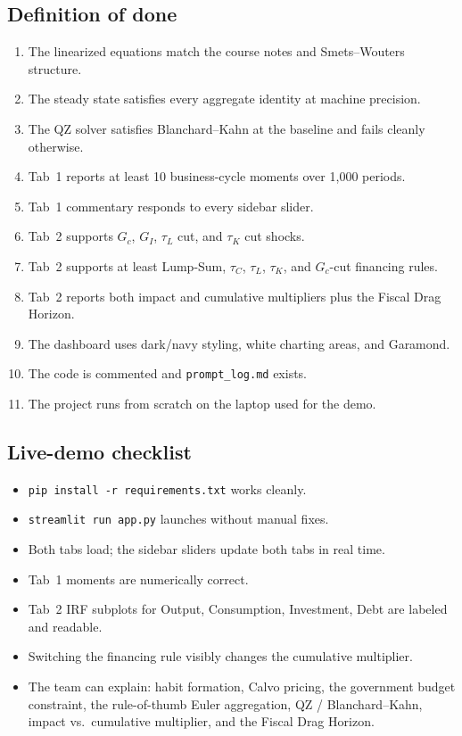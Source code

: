 \documentclass[11pt]{article}
\begin{document}
\subsection{Definition of done}
\begin{enumerate}[label=\textbf{\arabic*.}]
    \item The linearized equations match the course notes and Smets--Wouters structure.
    \item The steady state satisfies every aggregate identity at machine precision.
    \item The QZ solver satisfies Blanchard--Kahn at the baseline and fails cleanly otherwise.
    \item Tab~1 reports at least 10 business-cycle moments over 1{,}000 periods.
    \item Tab~1 commentary responds to every sidebar slider.
    \item Tab~2 supports $G_c$, $G_I$, $\tau_L$ cut, and $\tau_K$ cut shocks.
    \item Tab~2 supports at least Lump-Sum, $\tau_C$, $\tau_L$, $\tau_K$, and $G_c$-cut financing rules.
    \item Tab~2 reports both impact and cumulative multipliers plus the Fiscal Drag Horizon.
    \item The dashboard uses dark/navy styling, white charting areas, and Garamond.
    \item The code is commented and \texttt{prompt\_log.md} exists.
    \item The project runs from scratch on the laptop used for the demo.
\end{enumerate}

\subsection{Live-demo checklist}
\begin{itemize}
    \item \texttt{pip install -r requirements.txt} works cleanly.
    \item \texttt{streamlit run app.py} launches without manual fixes.
    \item Both tabs load; the sidebar sliders update both tabs in real time.
    \item Tab~1 moments are numerically correct.
    \item Tab~2 IRF subplots for Output, Consumption, Investment, Debt are labeled and readable.
    \item Switching the financing rule visibly changes the cumulative multiplier.
    \item The team can explain: habit formation, Calvo pricing, the government budget constraint, the rule-of-thumb Euler aggregation, QZ / Blanchard--Kahn, impact vs.\ cumulative multiplier, and the Fiscal Drag Horizon.
\end{itemize}
\end{document}
